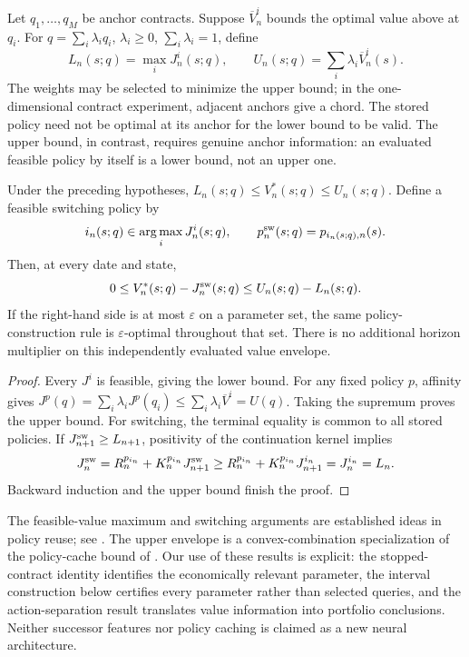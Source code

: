 Let $q_1,\ldots,q_M$ be anchor contracts. Suppose $\overline V^i_n$ bounds the optimal value above at $q_i$. For $q=\sum_i\lambda_iq_i$, $\lambda_i\geq0$, $\sum_i\lambda_i=1$, define
\begin{equation}
 L_n(s;q)=\max_i J^i_n(s;q),\qquad
 U_n(s;q)=\sum_i\lambda_i\overline V^i_n(s).
 \label{eq:envelopes}
\end{equation}
The weights may be selected to minimize the upper bound; in the one-dimensional contract experiment, adjacent anchors give a chord. The stored policy need not be optimal at its anchor for the lower bound to be valid. The upper bound, in contrast, requires genuine anchor information: an evaluated feasible policy by itself is a lower bound, not an upper one.

\begin{theorem}
\label{thm:reuse}
Under the preceding hypotheses, $L_n(s;q)\leq V_n^*(s;q)\leq U_n(s;q)$. Define a feasible switching policy by
\begin{equation}
 i_n(s;q)\in\operatorname*{arg\,max}_iJ^i_n(s;q),\qquad
 p_n^{\rm sw}(s;q)=p_{i_n(s;q),n}(s).
 \label{eq:switch}
\end{equation}
Then, at every date and state,
\begin{equation}
 0\leq V_n^*(s;q)-J_n^{\rm sw}(s;q)
 \leq U_n(s;q)-L_n(s;q).
 \label{eq:reuse_bound}
\end{equation}
If the right-hand side is at most $\varepsilon$ on a parameter set, the same policy-construction rule is $\varepsilon$-optimal throughout that set. There is no additional horizon multiplier on this independently evaluated value envelope.
\end{theorem}

\begin{proof}
Every $J^i$ is feasible, giving the lower bound. For any fixed policy $p$, affinity gives $J^p(q)=\sum_i\lambda_iJ^p(q_i)\leq\sum_i\lambda_i\overline V^i=U(q)$. Taking the supremum proves the upper bound. For switching, the terminal equality is common to all stored policies. If $J_{n+1}^{\rm sw}\geq L_{n+1}$, positivity of the continuation kernel implies
\[
 J_n^{\rm sw}=R_n^{p_{i_n}}+K_n^{p_{i_n}}J_{n+1}^{\rm sw}
 \geq R_n^{p_{i_n}}+K_n^{p_{i_n}}J^{i_n}_{n+1}
 =J^{i_n}_n=L_n.
\]
Backward induction and the upper bound finish the proof.
\end{proof}

The feasible-value maximum and switching arguments are established ideas in policy reuse; see \citet{barreto2017,chang2021}. The upper envelope is a convex-combination specialization of the policy-cache bound of \citet{nemecek2021}. Our use of these results is explicit: the stopped-contract identity identifies the economically relevant parameter, the interval construction below certifies every parameter rather than selected queries, and the action-separation result translates value information into portfolio conclusions. Neither successor features nor policy caching is claimed as a new neural architecture.

